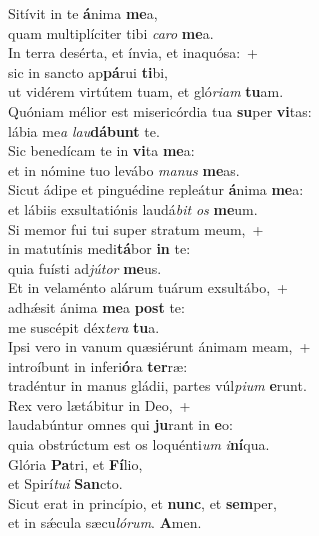 \evenverse Sitívit in te \textbf{á}nima \textbf{me}a,~\*\\
\evenverse quam multiplíciter tibi \textit{ca}\textit{ro} \textbf{me}a.\\
\oddverse In terra desérta, et ínvia, et inaquósa:~+\\
\oddverse  sic in sancto ap\textbf{pá}rui \textbf{ti}bi,~\*\\
\oddverse ut vidérem virtútem tuam, et gló\textit{ri}\textit{am} \textbf{tu}am.\\
\evenverse Quóniam mélior est misericórdia tua \textbf{su}per \textbf{vi}tas:~\*\\
\evenverse lábia me\textit{a} \textit{lau}\textbf{dá}\textbf{bunt} te.\\
\oddverse Sic benedícam te in \textbf{vi}ta \textbf{me}a:~\*\\
\oddverse et in nómine tuo levábo \textit{ma}\textit{nus} \textbf{me}as.\\
\evenverse Sicut ádipe et pinguédine repleátur \textbf{á}nima \textbf{me}a:~\*\\
\evenverse et lábiis exsultatiónis laudá\textit{bit} \textit{os} \textbf{me}um.\\
\oddverse Si memor fui tui super stratum meum,~+\\
\oddverse  in matutínis medi\textbf{tá}bor \textbf{in} te:~\*\\
\oddverse quia fuísti ad\textit{jú}\textit{tor} \textbf{me}us.\\
\evenverse Et in velaménto alárum tuárum exsultábo,~+\\
\evenverse  adhǽsit ánima \textbf{me}a \textbf{post} te:~\*\\
\evenverse me suscépit déx\textit{te}\textit{ra} \textbf{tu}a.\\
\oddverse Ipsi vero in vanum quæsiérunt ánimam meam,~+\\
\oddverse  introíbunt in inferi\textbf{ó}ra \textbf{ter}ræ:~\*\\
\oddverse tradéntur in manus gládii, partes vúl\textit{pi}\textit{um} \textbf{e}runt.\\
\evenverse Rex vero lætábitur in Deo,~+\\
\evenverse  laudabúntur omnes qui \textbf{ju}rant in \textbf{e}o:~\*\\
\evenverse quia obstrúctum est os loquénti\textit{um} \textit{i}\textbf{ní}qua.\\
\oddverse Glória \textbf{Pa}tri, et \textbf{Fí}lio,~\*\\
\oddverse et Spirí\textit{tu}\textit{i} \textbf{San}cto.\\
\evenverse Sicut erat in princípio, et \textbf{nunc}, et \textbf{sem}per,~\*\\
\evenverse et in sǽcula sæcu\textit{ló}\textit{rum}. \textbf{A}men.\\

